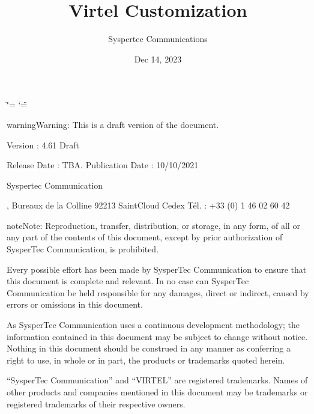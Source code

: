 \documentclass[letterpaper,10pt,english]{sphinxmanual}
\title{Virtel Customization}
\date{Dec 14, 2023}
\author{Syspertec Communications}
\begin{document}
\ifdefined\shorthandoff
  \ifnum\catcode`\=\string=\active\shorthandoff{=}\fi
  \ifnum\catcode`\"=\active{}\fi
\fi

\pagestyle{empty}
\sphinxmaketitle
\pagestyle{plain}
\sphinxtableofcontents
\pagestyle{normal}
\label{\detokenize{Customization::doc}}


\sphinxAtStartPar
{}

\sphinxAtStartPar
{}

\begin{sphinxadmonition}{warning}{Warning:}
\sphinxAtStartPar
This is a draft version of the document.
\end{sphinxadmonition}

\sphinxAtStartPar
Version : 4.61 Draft

\sphinxAtStartPar
Release Date : TBA. Publication Date : 10/10/2021

\sphinxAtStartPar
Syspertec Communication

, Bureaux de la Colline 92213 Saint\sphinxhyphen{}Cloud Cedex Tél. : +33 (0) 1 46 02 60 42

\sphinxAtStartPar
{}

\begin{sphinxadmonition}{note}{Note:}
\sphinxAtStartPar
Reproduction, transfer, distribution, or storage, in any form, of all or any part of
the contents of this document, except by prior authorization of SysperTec
Communication, is prohibited.

\sphinxAtStartPar
Every possible effort has been made by SysperTec Communication to ensure that this document
is complete and relevant. In no case can SysperTec Communication be held responsible for
any damages, direct or indirect, caused by errors or omissions in this document.

\sphinxAtStartPar
As SysperTec Communication uses a continuous development methodology; the information
contained in this document may be subject to change without notice. Nothing in this
document should be construed in any manner as conferring a right to use, in whole or in
part, the products or trademarks quoted herein.

\sphinxAtStartPar
“SysperTec Communication” and “VIRTEL” are registered trademarks. Names of other products
and companies mentioned in this document may be trademarks or registered trademarks of
their respective owners.
\end{sphinxadmonition}
\end{document}
